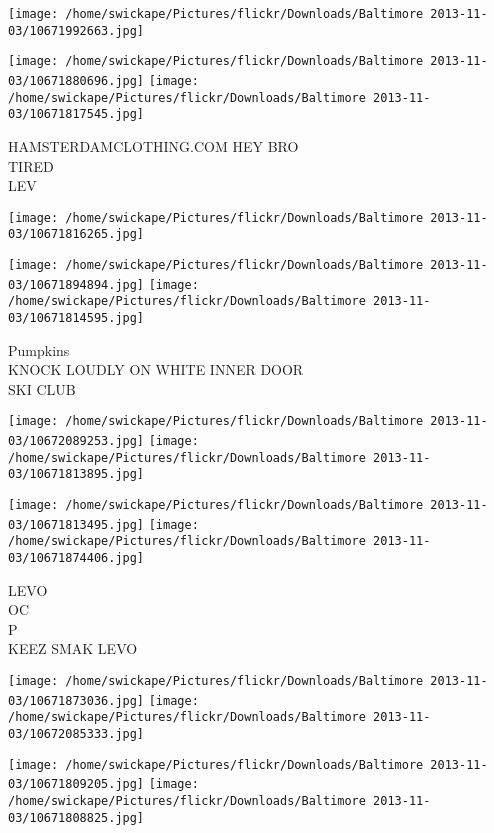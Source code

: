 \documentclass[10pt,letterpaper]{article}
\begin{document}
\texttt{[image: /home/swickape/Pictures/flickr/Downloads/Baltimore 2013-11-03/10671992663.jpg]}

\vspace{0.25in}
\texttt{[image: /home/swickape/Pictures/flickr/Downloads/Baltimore 2013-11-03/10671880696.jpg]}
\texttt{[image: /home/swickape/Pictures/flickr/Downloads/Baltimore 2013-11-03/10671817545.jpg]}

HAMSTERDAMCLOTHING.COM HEY BRO\\
TIRED\\
LEV\\
\pagebreak

\texttt{[image: /home/swickape/Pictures/flickr/Downloads/Baltimore 2013-11-03/10671816265.jpg]}

\vspace{0.25in}
\texttt{[image: /home/swickape/Pictures/flickr/Downloads/Baltimore 2013-11-03/10671894894.jpg]}
\texttt{[image: /home/swickape/Pictures/flickr/Downloads/Baltimore 2013-11-03/10671814595.jpg]}

Pumpkins\\
KNOCK LOUDLY ON WHITE INNER DOOR\\
SKI CLUB\\
\pagebreak

\texttt{[image: /home/swickape/Pictures/flickr/Downloads/Baltimore 2013-11-03/10672089253.jpg]}
\texttt{[image: /home/swickape/Pictures/flickr/Downloads/Baltimore 2013-11-03/10671813895.jpg]}

\texttt{[image: /home/swickape/Pictures/flickr/Downloads/Baltimore 2013-11-03/10671813495.jpg]}
\texttt{[image: /home/swickape/Pictures/flickr/Downloads/Baltimore 2013-11-03/10671874406.jpg]}

LEVO\\
OC\\
P\\
KEEZ SMAK LEVO\\
\pagebreak

\texttt{[image: /home/swickape/Pictures/flickr/Downloads/Baltimore 2013-11-03/10671873036.jpg]}
\texttt{[image: /home/swickape/Pictures/flickr/Downloads/Baltimore 2013-11-03/10672085333.jpg]}

\texttt{[image: /home/swickape/Pictures/flickr/Downloads/Baltimore 2013-11-03/10671809205.jpg]}
\texttt{[image: /home/swickape/Pictures/flickr/Downloads/Baltimore 2013-11-03/10671808825.jpg]}
\end{document}
